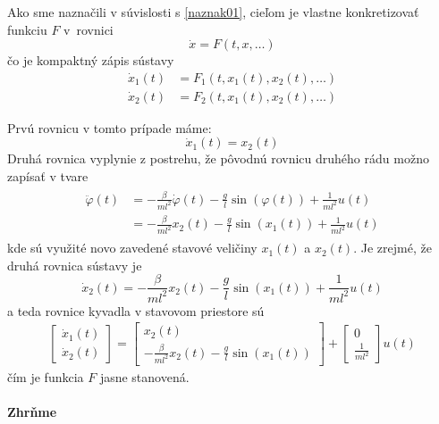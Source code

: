 \documentclass[a4paper, 10pt, ]{article}
\begin{document}
\bigskip

\noindent
Ako sme naznačili v súvislosti s \eqref{naznak01}, cieľom je vlastne konkretizovať funkciu $F$ v~rovnici
\begin{equation}
    \dot x = F(t, x, \ldots)
\end{equation}
čo je kompaktný zápis sústavy
\begin{align}
    \dot x_1(t) &= F_1 \left(t, x_1(t), x_2(t), \ldots \right) \\
    \dot x_2(t) &= F_2 \left(t, x_1(t), x_2(t), \ldots \right)
\end{align}

Prvú rovnicu v tomto prípade máme:
\begin{equation}
    \dot x_1(t) = x_2(t)
\end{equation}
Druhá rovnica vyplynie z postrehu, že pôvodnú rovnicu druhého rádu možno zapísať v tvare
\begin{align}
    \begin{split}
    \ddot \varphi(t) &= -\frac{\beta}{ml^2}\dot\varphi(t) - \frac{g}{l} \sin\left( \varphi(t) \right) + \frac{1}{ml^2} u(t) \\
                     &= -\frac{\beta}{ml^2} x_2(t) - \frac{g}{l} \sin\left( x_1(t) \right) + \frac{1}{ml^2} u(t)
    \end{split}
\end{align}
kde sú využité novo zavedené stavové veličiny $x_1(t)$ a $x_2(t)$. Je zrejmé, že druhá rovnica sústavy je
\begin{equation}
    \dot x_2(t) = -\frac{\beta}{ml^2} x_2(t) - \frac{g}{l} \sin\left( x_1(t) \right) + \frac{1}{ml^2} u(t)
\end{equation}
a teda rovnice kyvadla v stavovom priestore sú
\begin{align} \label{rovniceKyvSSpredpis}
    \begin{bmatrix} \dot x_1(t) \\ \dot x_2(t)  \end{bmatrix} = \begin{bmatrix} x_2(t) \\ -\frac{\beta}{ml^2} x_2(t) - \frac{g}{l} \sin\left( x_1(t) \right)  \end{bmatrix} + \begin{bmatrix} 0 \\ \frac{1}{ml^2} \end{bmatrix} u(t)
\end{align}
čím je funkcia $F$ jasne stanovená.

\paragraph{Zhrňme}
\end{document}
